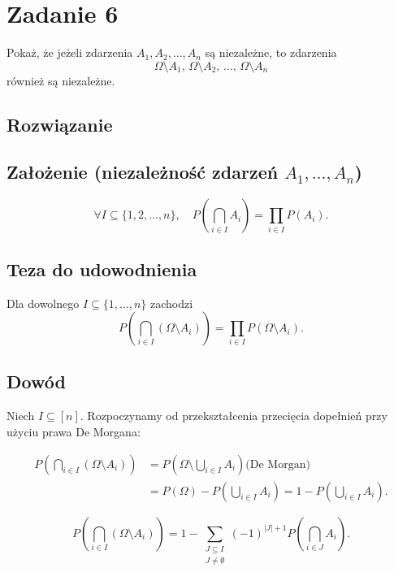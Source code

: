 \section{Zadanie 6}
Pokaż, że jeżeli zdarzenia \(A_1, A_2, \ldots, A_n\) są niezależne,
to zdarzenia
\[
	\Omega \setminus A_1,\, \Omega \setminus A_2,\, \ldots,\, \Omega \setminus A_n
\]
również są niezależne.

\subsection*{Rozwiązanie}

\subsection*{Założenie (niezależność zdarzeń \(A_1, \dots, A_n\))}

\[
	\forall I \subseteq \{1,2,\dots,n\}, \quad
	P\!\left(\bigcap_{i \in I} A_i \right) = \prod_{i \in I} P(A_i).
\]

\subsection*{Teza do udowodnienia}

Dla dowolnego \(I \subseteq \{1, \dots, n\}\) zachodzi
\[
	P\!\left(\bigcap_{i \in I} (\Omega \setminus A_i)\right)
	= \prod_{i \in I} P(\Omega \setminus A_i).
\]

\subsection*{Dowód}

Niech \(I \subseteq [n]\). Rozpoczynamy od przekształcenia przecięcia dopełnień przy użyciu prawa De Morgana:

\begin{align*}
	P\!\left( \bigcap_{i \in I} (\Omega \setminus A_i) \right)
	 & = P\!\left( \Omega \setminus \bigcup_{i \in I} A_i \right)
	\text{(De Morgan)}                                            \\
	 & = P(\Omega) - P\!\left( \bigcup_{i \in I} A_i \right)
	= 1 - P\!\left( \bigcup_{i \in I} A_i \right).
\end{align*}


\[
	P\!\left( \bigcap_{i \in I} (\Omega \setminus A_i) \right)
	= 1 - \sum_{\substack{J \subseteq I \\ J \neq \emptyset}} (-1)^{|J|+1} P\!\left( \bigcap_{i \in J} A_i \right).
\]

